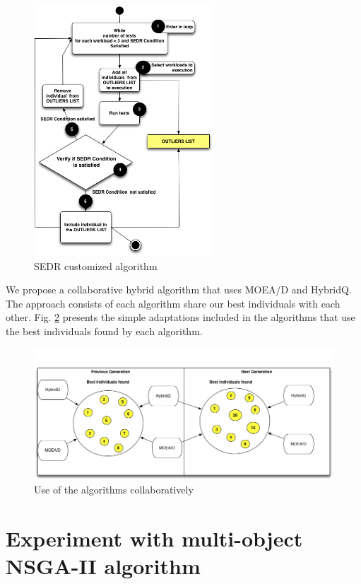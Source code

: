 \documentclass[espaco=umemeio,chapter=TITLE,twoside,openright]{abnt}
\begin{document}
\begin{figure}[!h]
\centering
\includegraphics[width=0.6\textwidth]{./images/suspectlist.png}
\caption{SEDR customized algorithm}
\label{fig:sedrcustomized}
\end{figure}


We propose a collaborative hybrid algorithm that uses MOEA/D and HybridQ. The approach consists of each algorithm share our best individuals with each other. Fig. \ref{fig:co2} presents the simple adaptations included in the algorithms that use the best individuals found by each algorithm.

\begin{figure}[h]
\centering
\includegraphics[width=1\textwidth]{./images/collaborative2.png}
\caption{Use of the  algorithms collaboratively}
\label{fig:co2}
\end{figure}



\section{Experiment with multi-object NSGA-II algorithm}
\end{document}
